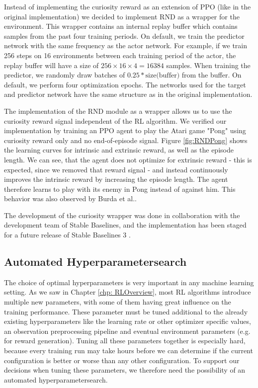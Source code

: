 Instead of implementing the curiosity reward as an extension of PPO (like in the original implementation) we decided to implement RND as a wrapper for the environment. This wrapper contains an internal replay buffer which contains samples from the past four training periods. On default, we train the predictor network with the same frequency as the actor network. For example, if we train 256 steps on 16 environments between each training period of the actor, the replay buffer will have a size of $256 \times 16 \times 4 = 16384$ samples. When training the predictor, we randomly draw batches of $0.25*\text{size(buffer)}$ from the buffer. On default, we perform four optimization epochs. The networks used for the target and predictor network have the same structure as in the original implementation.

The implementation of the RND module as a wrapper allows us to use the curiosity reward signal independent of the RL algorithm. We verified our implementation by training an PPO agent to play the Atari game "Pong" using curiosity reward only and no end-of-episode signal. Figure \ref{fig:RNDPong} shows the learning curves for intrinsic and extrinsic reward, as well as the episode length. We can see, that the agent does not optimize for extrinsic reward - this is expected, since we removed that reward signal - and instead continuously improves the intrinsic reward by increasing the episode length. The agent therefore learns to play with its enemy in Pong instead of against him. This behavior was also observed by Burda et al.\cite{burda2018exploration}.

The development of the curiosity wrapper was done in collaboration with the development team of Stable Baselines, and the implementation has been staged for a future release of Stable Baselines 3 \cite{stable-baselines-intrinsic}.

\subsection{Automated Hyperparametersearch} \label{sec:blSearch}
The choice of optimal hyperparameters is very important in any machine learning setting. As we saw in Chapter \ref{chp: RLOverview}, most RL algorithms introduce multiple new parameters, with some of them having great influence on the training performance. These parameter must be tuned additional to the already existing hyperparameters like the learning rate or other optimizer specific values, an observation preprocessing pipeline and eventual environment parameters (e.g. for reward generation). Tuning all these parameters together is especially hard, because every training run may take hours before we can determine if the current configuration is better or worse than any other configuration. To support our decisions when tuning these parameters, we therefore need the possibility of an automated hyperparametersearch. 


